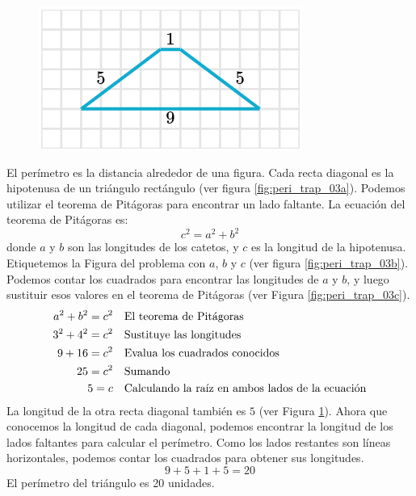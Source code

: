 \begin{solutionbox}{10cm}
\begin{minipage}{0.95\textwidth}
\begin{figure}[H]
            \centering
            \includegraphics[width=0.25\linewidth]{../images/peri_trap_03d.png}
            \caption{}
            \label{fig:peri_trap_03d}
        \end{figure}
    \end{minipage}%
    El perímetro es la distancia alrededor de una figura.
    Cada recta diagonal es la hipotenusa de un triángulo rectángulo (ver figura \ref{fig:peri_trap_03a}).
    Podemos utilizar el teorema de Pitágoras para encontrar un lado faltante.
    La ecuación del teorema de Pitágoras es:
    \[c^2=a^2+b^2\]
    donde $a$ y $b$ son las longitudes de los catetos, y $c$ es la longitud de la hipotenusa.
    Etiquetemos la Figura del problema con $a$, $b$ y $c$ (ver figura \ref{fig:peri_trap_03b}).
    Podemos contar los cuadrados para encontrar las longitudes de $a$ y $b$, y luego sustituir esos valores en el teorema de Pitágoras (ver Figura \ref{fig:peri_trap_03c}).
    \begin{align*}
        a^2+b^2  =c^2 & \text{\quad El teorema de Pitágoras}                          \\
        3^2+4^2  =c^2 & \text{\quad Sustituye las longitudes}                         \\
        9 +16 =c^2    & \text{\quad Evalua los cuadrados conocidos}                   \\
        25=c^2        & \text{\quad Sumando }                                         \\
        5=c           & \text{\quad Calculando la raíz en ambos lados de la ecuación} \\
    \end{align*}
    La longitud de la otra recta diagonal también es $5$ (ver Figura \ref{fig:peri_trap_03d}).
    Ahora que conocemos la longitud de cada diagonal, podemos encontrar la longitud de los lados faltantes para calcular el perímetro.
    Como los lados restantes son líneas horizontales, podemos contar los cuadrados para obtener sus longitudes.
    \[9+5+1+5=20\]
    El perímetro del triángulo es 20 unidades.
\end{solutionbox}
